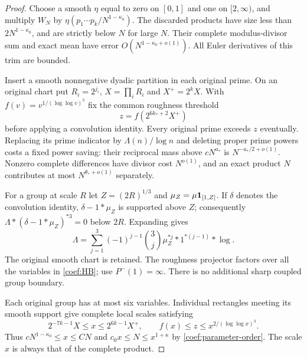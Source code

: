 \begin{proof}
Choose a smooth $\eta$ equal to zero on $[0,1]$ and one on $[2,\infty)$,
and multiply $W_N$ by $\eta(p_1\cdots p_k/N^{1-\kappa_0})$.
The discarded products have size less than $2N^{1-\kappa_0}$, and are
strictly below $N$ for large $N$.  Their complete modulus-divisor sum
and exact mean have error $O(N^{1-\kappa_0+o(1)})$.
All Euler derivatives of this trim are bounded.

Insert a smooth nonnegative dyadic partition in each original prime.
On an original chart put $R_i=2^{j_i}$, $X=\prod_iR_i$ and $X^+=2^kX$.
With $f(v)=v^{1/(\log\log v)^3}$ fix the common roughness threshold
\[
 z=f(2^{6k_*+2}X^+)
\]
before applying a convolution identity.  Every original prime exceeds
$z$ eventually.  Replacing its prime indicator by $\Lambda(n)/\log n$
and deleting proper prime powers costs a fixed power saving: their
reciprocal mass above $cN^{a_*}$ is $N^{-a_*/2+o(1)}$.
Nonzero complete differences have divisor cost $N^{o(1)}$, and an exact
product $N$ contributes at most $N^{\theta_*+o(1)}$ separately.

For a group at scale $R$ let $Z=(2R)^{1/3}$ and
$\mu_Z=\mu\mathbf 1_{[1,Z]}$.  If $\delta$ denotes the convolution identity,
$\delta-1*\mu_Z$ is supported above $Z$; consequently
$\Lambda*(\delta-1*\mu_Z)^{*3}=0$ below $2R$.  Expanding gives
\begin{equation}
 \Lambda=\sum_{j=1}^3(-1)^{j-1}\binom3j
             \mu_Z^{*j}*1^{*(j-1)}*\log.
 \label{coef:HB}
\end{equation}
The original smooth chart is retained.  The roughness projector factors
over all the variables in \eqref{coef:HB}; use $P^-(1)=\infty$.
There is no additional sharp coupled group boundary.

Each original group has at most six variables.  Individual rectangles
meeting its smooth support give complete local scales satisfying
\begin{equation}
 2^{-7k-1}X\le x\le2^{6k-1}X^+,
 \qquad f(x)\le z\le x^{2/(\log\log x)^3}.
 \label{coef:complete-scales}
\end{equation}
Thus $cN^{1-\kappa_0}\le x\le CN$ and
$c_0x\le N\le x^{1+\kappa}$ by \eqref{coef:parameter-order}.
The scale $x$ is always that of the complete product.


\end{proof}
